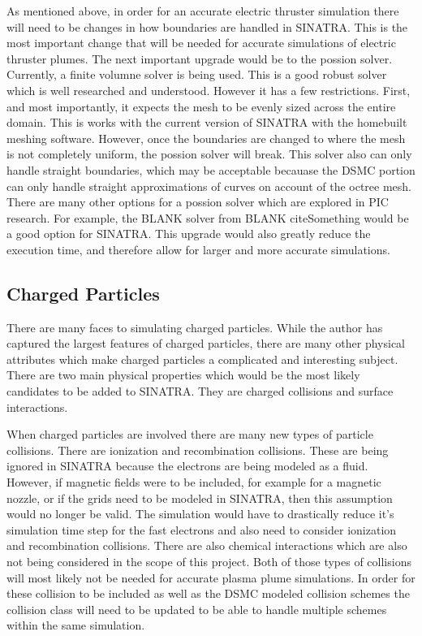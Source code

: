 As mentioned above, in order for an accurate electric thruster simulation there will need to be changes in how boundaries are handled in SINATRA. This is the most important change that will be needed for accurate simulations of electric thruster plumes. The next important upgrade would be to the possion solver. Currently, a finite volumne solver is being used. This is a good robust solver which is well researched and understood. However it has a few restrictions. First, and most importantly, it expects the mesh to be evenly sized across the entire domain. This is works with the current version of SINATRA with the homebuilt meshing software. However, once the boundaries are changed to where the mesh is not completely uniform, the possion solver will break. This solver also can only handle straight boundaries, which may be acceptable becauase the DSMC portion can only handle straight approximations of curves on account of the octree mesh. There are many other options for a possion solver which are explored in PIC research. For example, the BLANK solver from BLANK cite{Something} would be a good option for SINATRA. This upgrade would also greatly reduce the execution time, and therefore allow for larger and more accurate simulations. \par


\subsection{Charged Particles}

There are many faces to simulating charged particles. While the author has captured the largest features of charged particles, there are many other physical attributes which make charged particles a complicated and interesting subject. There are two main physical properties which would be the most likely candidates to be added to SINATRA. They are charged collisions and surface interactions. \par

\indent When charged particles are involved there are many new types of particle collisions. There are ionization and recombination collisions. These are being ignored in SINATRA because the electrons are being modeled as a fluid. However, if magnetic fields were to be included, for example for a magnetic nozzle, or if the grids need to be modeled in SINATRA, then this assumption would no longer be valid. The simulation would have to drastically reduce it's simulation time step for the fast electrons and also need to consider ionization and recombination collisions. There are also chemical interactions which are also not being considered in the scope of this project. Both of those types of collisions will most likely not be needed for accurate plasma plume simulations. In order for these collision to be included as well as the DSMC modeled collision schemes the collision class will need to be updated to be able to handle multiple schemes within the same simulation. \par

